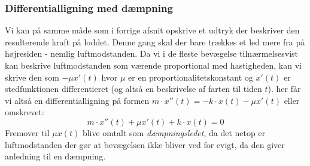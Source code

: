 \subsubsection{Differentialligning med dæmpning}\label{teori: Opstilling af ligning med dampning}
Vi kan på samme måde som i forrige afsnit opskrive et udtryk der beskriver den resulterende kraft på loddet. 
Denne gang skal der bare trækkes et led mere fra på højresiden - nemlig luftmodstanden. 
Da vi i de fleste bevægelse tilnærmelsesvist kan beskrive luftmodstanden som værende proportional med hastigheden, kan vi skrive den som $- \mu x'(t)$ hvor $\mu$ er en proportionalitetskonstant og $x'(t)$ er stedfunktionen differentieret (og altså en beskrivelse af farten til tiden $t$).
her får vi altså en differentialligning på formen $m\cdot x''(t)=-k\cdot x(t)-\mu x'(t)$ eller omskrevet:
$$m\cdot x''(t)+\mu x'(t)+k\cdot x(t)=0$$
Fremover til $\mu x(t)$ blive omtalt som \textit{dæmpningsledet}, da det netop er luftmodstanden der gør at bevægelsen ikke bliver ved for evigt, da den giver anledning til en dæmpning. 